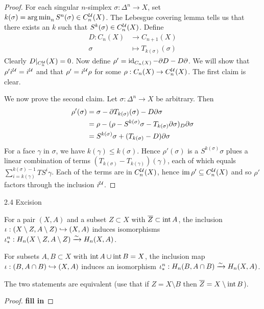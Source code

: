 \begin{proof}
  For each singular $n$-simplex $\sigma: \Delta^n \to X$, set $k(\sigma) = \operatorname*{arg\,min}_n S^{n}(\sigma) \in C_n^{\mathcal{U}}(X)$.
  The Lebesgue covering lemma tells us that there exists an $k$ such that $S^k(\sigma) \in C_n^{\mathcal{U}}(X)$.
  Define
  \begin{align*}
    D: C_n(X) &\to C_{n+1}(X) \\
    \sigma &\mapsto T_{k(\sigma)}(\sigma)
  \end{align*}
  Clearly $D|_{C_n^{\mathcal{U}}}(X)=0$.
  Now define $\rho' = \operatorname{id}_{C_n(X)} - \partial D-D\partial$.
  We will show that $\rho' i^{\mathcal{U}} = i^{\mathcal{U}}$ and that $\rho'=i^{\mathcal{U}}\rho$ for some $\rho: C_n(X) \to C_n^{\mathcal{U}}(X)$.
  The first claim is clear.

  We now prove the second claim.
  Let $\sigma: \Delta^n \to X$ be arbitrary.
  Then
  \begin{align*}
    \rho'(\sigma) &= \sigma -\partial T_{k(\sigma)}(\sigma) - D\partial\sigma \\
    &= \rho - (\rho - S^{k(\sigma)}\sigma - T_{k(\sigma)}\partial\sigma) _ D\partial\sigma \\
    &= S^{k(\sigma)}\sigma + (T_{k(\sigma)}-D)\partial\sigma
  \end{align*}
  For a face $\gamma$ in $\sigma$, we have $k(\gamma) \leq k(\sigma)$.
  Hence $\rho'(\sigma)$ is a $S^{k(\sigma)}\sigma$ plues a linear combination of terms $(T_{k(\sigma)}-T_{k(\gamma)})(\gamma)$, each of which equals $\sum_{i=k(\gamma)}^{k(\sigma)-1} TS^i\gamma$.
  Each of the terms are in $C_n^{\mathcal{U}}(X)$, hence $\operatorname{im}\rho' \subseteq C_n^{\mathcal{U}}(X)$ and so $\rho'$ factors through the inclusion $i^{\mathcal{U}}$.
\end{proof}

2.4 Excision

\begin{thm}[Excision]
  \lv
  \begin{enum}
    \io
    For a pair $(X,A)$ and a subset $Z \subset X$ with $\overline Z \subset \operatorname{int} A$, the inclusion $\iota: (X \setminus Z, A \setminus Z) \hookrightarrow (X,A)$ induces isomorphisms $\iota_*^n: H_n(X \setminus Z, A \setminus Z) \xrightarrow{\sim} H_n(X,A)$.
    
    \io
    For subsets $A,B \subset X$ with $\operatorname{int} A \cup \operatorname{int} B = X$, the inclusion map $\iota: (B,A \cap B) \hookrightarrow (X,A)$ induces an isomorphism $\iota_*^n: H_n(B, A \cap B) \xrightarrow{\sim} H_n(X,A)$.
  \end{enum}
\end{thm}

\begin{rmk}
  The two statements are equivalent (use that if $Z = X \setminus B$ then $\overline Z = X \setminus \operatorname{int} B$).
\end{rmk}

\begin{proof}
  \textbf{fill in}
\end{proof}
